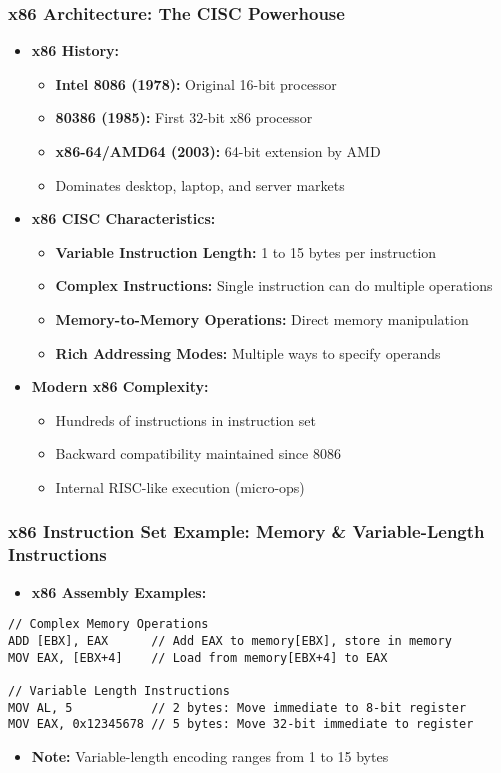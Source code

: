 \begin{frame}
\frametitle{x86 Architecture: The CISC Powerhouse}
\begin{itemize}
    \item \textbf{x86 History:}
    \begin{itemize}
        \item \textbf{Intel 8086 (1978):} Original 16-bit processor
        \item \textbf{80386 (1985):} First 32-bit x86 processor
        \item \textbf{x86-64/AMD64 (2003):} 64-bit extension by AMD
        \item Dominates desktop, laptop, and server markets
    \end{itemize}
    \item \textbf{x86 CISC Characteristics:}
    \begin{itemize}
        \item \textbf{Variable Instruction Length:} 1 to 15 bytes per instruction
        \item \textbf{Complex Instructions:} Single instruction can do multiple operations
        \item \textbf{Memory-to-Memory Operations:} Direct memory manipulation
        \item \textbf{Rich Addressing Modes:} Multiple ways to specify operands
    \end{itemize}
    \item \textbf{Modern x86 Complexity:}
    \begin{itemize}
        \item Hundreds of instructions in instruction set
        \item Backward compatibility maintained since 8086
        \item Internal RISC-like execution (micro-ops)
    \end{itemize}
\end{itemize}
\end{frame}

\begin{frame}[fragile]
\frametitle{x86 Instruction Set Example: Memory \& Variable-Length Instructions}
    \begin{itemize}
        \item \textbf{x86 Assembly Examples:}
    \end{itemize}
\begin{verbatim}
// Complex Memory Operations
ADD [EBX], EAX      // Add EAX to memory[EBX], store in memory
MOV EAX, [EBX+4]    // Load from memory[EBX+4] to EAX

// Variable Length Instructions
MOV AL, 5           // 2 bytes: Move immediate to 8-bit register
MOV EAX, 0x12345678 // 5 bytes: Move 32-bit immediate to register
\end{verbatim}
\begin{itemize}
    \item \textbf{Note:} Variable-length encoding ranges from 1 to 15 bytes
\end{itemize}
\end{frame}

